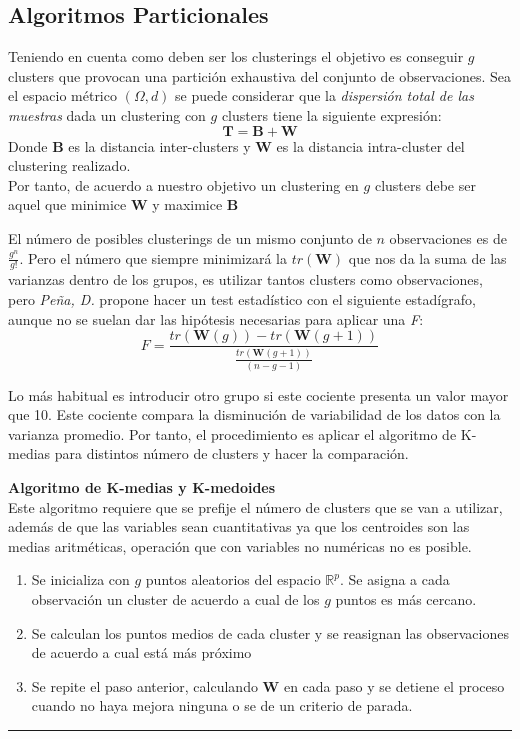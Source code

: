 \subsection{Algoritmos Particionales}
\noindent Teniendo en cuenta como deben ser los clusterings el objetivo es conseguir $g$ clusters que provocan una partición exhaustiva del conjunto de observaciones. 
Sea el espacio métrico $(\Omega,d)$ se puede considerar que la \textit{dispersión total de las muestras} dada un clustering con $g$ clusters tiene la siguiente expresión:
\begin{equation}
\textbf{T}=\textbf{B}+\textbf{W}
\end{equation}
\noindent Donde $\mathbf{B}$ es la distancia inter-clusters y $\mathbf{W}$ es la distancia intra-cluster del clustering realizado.\\
\noindent Por tanto, de acuerdo a nuestro objetivo un clustering en $g$ clusters debe ser aquel que minimice $\mathbf{W}$ y maximice $\mathbf{B}$

\noindent El número de posibles clusterings de un mismo conjunto de $n$ observaciones es de $\frac{g^n}{g!}$. Pero el número que siempre minimizará la $tr(\mathbf{W})$ que nos da la suma de las varianzas dentro de los grupos, es utilizar tantos clusters como observaciones, pero \emph{Peña, D.} \cite{Peña 2002} propone hacer un test estadístico con el siguiente estadígrafo, aunque no se suelan dar las hipótesis necesarias para aplicar una \emph{F}:
\begin{equation}
F=\dfrac{tr(\mathbf{W}(g))-tr(\mathbf{W}(g+1))}{\frac{tr(\mathbf{W}(g+1))}{(n-g-1)}}
\end{equation}

\noindent Lo más habitual es introducir otro grupo si este cociente presenta un valor mayor que 10. Este cociente compara la disminución de variabilidad de los datos con la varianza promedio. Por tanto, el procedimiento es aplicar el algoritmo de K-medias para distintos número de clusters y hacer la comparación. 

\noindent 



\noindent \textbf{Algoritmo de K-medias y K-medoides}\\
Este algoritmo requiere que se prefije el número de clusters que se van a utilizar, además de que las variables sean cuantitativas ya que los centroides son las medias aritméticas, operación que con variables no numéricas no es posible. \\
\begin{enumerate}
\hrule

\item Se inicializa con $g$ puntos aleatorios del espacio $\mathbb{R}^p$. Se asigna a cada observación un cluster de acuerdo a cual de los $g$ puntos es más cercano.
\item Se calculan los puntos medios de cada cluster y se reasignan las observaciones de acuerdo a cual está más próximo 
\item Se repite el paso anterior, calculando $\mathbf{W}$ en cada paso y se detiene el proceso cuando no haya mejora ninguna o se de un criterio de parada. 

\end{enumerate}
\hrule

